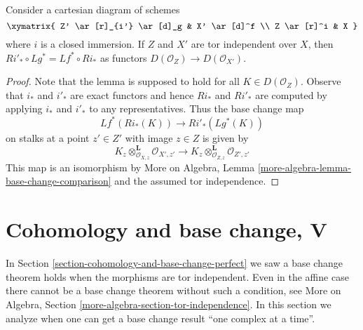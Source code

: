 \begin{lemma}
\label{lemma-compare-base-change-closed-immersion}
Consider a cartesian diagram of schemes
$$
\xymatrix{
Z' \ar[r]_{i'} \ar[d]_g & X' \ar[d]^f \\
Z \ar[r]^i & X
}
$$
where $i$ is a closed immersion. If $Z$ and $X'$ are
tor independent over $X$, then $Ri'_* \circ Lg^* = Lf^* \circ Ri_*$
as functors $D(\mathcal{O}_Z) \to D(\mathcal{O}_{X'})$.
\end{lemma}

\begin{proof}
Note that the lemma is supposed to hold for all $K \in D(\mathcal{O}_Z)$.
Observe that $i_*$ and $i'_*$ are exact functors and hence
$Ri_*$ and $Ri'_*$ are computed by applying $i_*$ and $i'_*$
to any representatives. Thus the base change map
$$
Lf^*(Ri_*(K)) \longrightarrow Ri'_*(Lg^*(K))
$$
on stalks at a point $z' \in Z'$ with image $z \in Z$ is given by
$$
K_z \otimes_{\mathcal{O}_{X, z}}^\mathbf{L} \mathcal{O}_{X', z'}
\longrightarrow
K_z \otimes_{\mathcal{O}_{Z, z}}^\mathbf{L} \mathcal{O}_{Z', z'}
$$
This map is an isomorphism by
More on Algebra, Lemma \ref{more-algebra-lemma-base-change-comparison}
and the assumed tor independence.
\end{proof}









\section{Cohomology and base change, V}
\label{section-cohomology-base-change}

\noindent
In Section \ref{section-cohomology-and-base-change-perfect}
we saw a base change theorem holds when the morphisms are tor independent.
Even in the affine case there cannot be a base change theorem without such
a condition, see
More on Algebra, Section \ref{more-algebra-section-tor-independence}.
In this section we analyze when one can get a base change result
``one complex at a time''.

